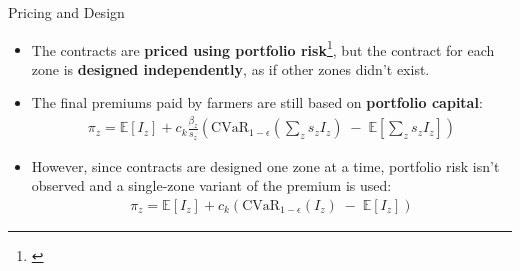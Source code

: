 \documentclass{beamer}
\begin{document}

\begin{frame}{Pricing and Design}
  \begin{itemize}
    \setlength \itemsep{2em}
    \item The contracts are \textbf{priced using portfolio risk}\footnote{\cite{mapfumo2017risk}}, but the contract for each zone is \textbf{designed independently}, as if other zones didn't exist.  
    \item The final premiums paid by farmers are still based on \textbf{portfolio capital}:
    \begin{align*}
      \pi_z = \mathbb{E}[I_z]+ c_k \frac{\beta_z}{s_z} \left ( \mathrm{CVaR}_{1-\epsilon}\left (\sum_z s_z I_z\right )\;-\;\mathbb{E}\left [\sum_z s_z I_z \right ] \right )
    \end{align*}
    \item However, since contracts are designed one zone at a time, portfolio risk isn't observed and a single-zone variant of the premium is used:
    \begin{align*}
      \pi_z = \mathbb{E}[I_z]+ c_k \left ( \mathrm{CVaR}_{1-\epsilon}(I_z)\;-\;\mathbb{E}[I_z] \right )
    \end{align*}
  \end{itemize}
\end{frame}
\end{document}
